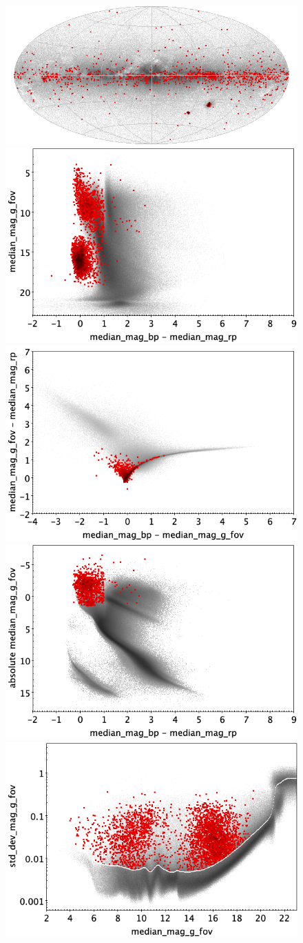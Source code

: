 \documentclass[longauth]{aa}
\begin{document}
\begin{appendix}
\begin{figure}
\centering
{} \includegraphics[width=0.6\hsize]{figures/appendix/BE_trn_sky.png} \\ %
\vspace{4mm}
 \includegraphics[width=0.45\hsize]{figures/appendix/BE_trn_cm.png}  %
\hspace{2mm}
 \includegraphics[width=0.45\hsize]{figures/appendix/BE_trn_cc.png} \\ %
\vspace{4mm}
 \includegraphics[width=0.45\hsize]{figures/appendix/BE_trn_cam.png}  %
\hspace{2mm}
 \includegraphics[width=0.45\hsize]{figures/appendix/BE_trn_msd.png} \\ %

\end{figure}
\end{appendix}
\end{document}
